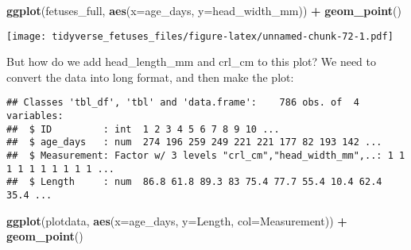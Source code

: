 \documentclass[
]{article}
\newenvironment{Shaded}{\begin{snugshade}}{\end{snugshade}}
\newcommand{\DataTypeTok}[1]{\textcolor[rgb]{0.13,0.29,0.53}{#1}}
\newcommand{\KeywordTok}[1]{\textcolor[rgb]{0.13,0.29,0.53}{\textbf{#1}}}
\newcommand{\NormalTok}[1]{#1}
\newcommand{\OperatorTok}[1]{\textcolor[rgb]{0.81,0.36,0.00}{\textbf{#1}}}
\newcommand{\StringTok}[1]{\textcolor[rgb]{0.31,0.60,0.02}{#1}}
\begin{document}
\begin{Shaded}
\begin{Highlighting}[]
\KeywordTok{ggplot}\NormalTok{(fetuses_full, }\KeywordTok{aes}\NormalTok{(}\DataTypeTok{x=}\NormalTok{age_days, }\DataTypeTok{y=}\NormalTok{head_width_mm)) }\OperatorTok{+}
\StringTok{    }\KeywordTok{geom_point}\NormalTok{()}
\end{Highlighting}
\end{Shaded}

\texttt{[image: tidyverse\_fetuses\_files/figure-latex/unnamed-chunk-72-1.pdf]}

But how do we add head\_length\_mm and crl\_cm to this plot? We need to
convert the data into long format, and then make the plot:

\begin{Shaded}
\end{Shaded}

\begin{verbatim}
## Classes 'tbl_df', 'tbl' and 'data.frame':    786 obs. of  4 variables:
##  $ ID         : int  1 2 3 4 5 6 7 8 9 10 ...
##  $ age_days   : num  274 196 259 249 221 221 177 82 193 142 ...
##  $ Measurement: Factor w/ 3 levels "crl_cm","head_width_mm",..: 1 1 1 1 1 1 1 1 1 1 ...
##  $ Length     : num  86.8 61.8 89.3 83 75.4 77.7 55.4 10.4 62.4 35.4 ...
\end{verbatim}

\begin{Shaded}
\begin{Highlighting}[]
\KeywordTok{ggplot}\NormalTok{(plotdata, }\KeywordTok{aes}\NormalTok{(}\DataTypeTok{x=}\NormalTok{age_days, }\DataTypeTok{y=}\NormalTok{Length, }\DataTypeTok{col=}\NormalTok{Measurement)) }\OperatorTok{+}
\StringTok{    }\KeywordTok{geom_point}\NormalTok{()}
\end{Highlighting}
\end{Shaded}
\end{document}
